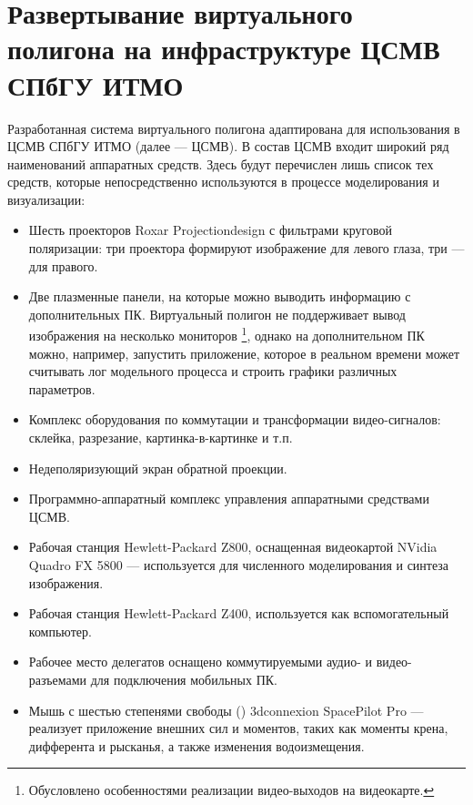 
\section{Развертывание виртуального полигона на инфраструктуре ЦСМВ СПбГУ ИТМО}

Разработанная система виртуального полигона адаптирована для использования в ЦСМВ СПбГУ ИТМО (далее --- ЦСМВ).
В состав ЦСМВ входит широкий ряд наименований аппаратных средств. Здесь будут перечислен лишь список тех средств, которые непосредственно используются в процессе моделирования и визуализации:

\begin{itemize}
	\item	Шесть проекторов Roxar Projectiondesign с фильтрами круговой поляризации: три проектора формируют 
			изображение для левого глаза, три --- для правого.
	\item	Две плазменные панели, на которые можно выводить информацию с дополнительных ПК. 
			Виртуальный полигон не поддерживает вывод изображения на несколько мониторов
			\footnote{Обусловлено особенностями реализации видео-выходов на видеокарте.}, 
			однако на дополнительном ПК можно, например, запустить приложение, которое 
			в реальном времени может считывать лог модельного процесса и строить графики различных 
			параметров.
	\item	Комплекс оборудования по коммутации и трансформации видео-сигналов: 
			склейка, разрезание, картинка-в-картинке и т.п.
	\item	Недеполяризующий экран обратной проекции.
	\item	Программно-аппаратный комплекс управления аппаратными средствами ЦСМВ.
	\item	Рабочая станция Hewlett-Packard Z800, оснащенная видеокартой NVidia Quadro FX 5800
			 --- используется для численного моделирования и синтеза изображения.
	\item	Рабочая станция Hewlett-Packard Z400, используется как вспомогательный компьютер.
	\item	Рабочее место делегатов оснащено коммутируемыми аудио- и видео-разъемами для подключения
			мобильных ПК.
	\item	Мышь с шестью степенями свободы () 3dconnexion SpacePilot Pro --- реализует приложение внешних сил и моментов, таких как моменты крена, дифферента и рысканья, а также изменения водоизмещения.

	
	
\end{itemize}

